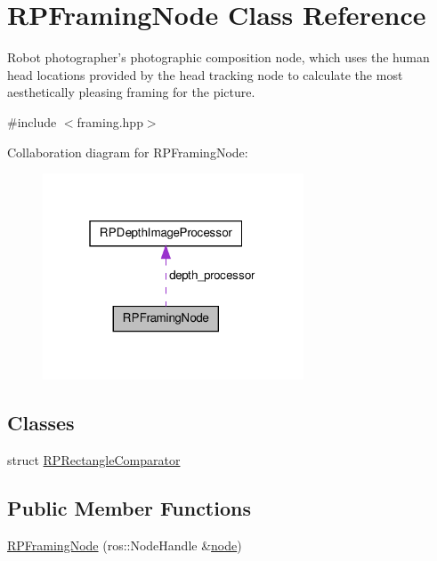 \hypertarget{class_r_p_framing_node}{\section{\-R\-P\-Framing\-Node \-Class \-Reference}
\label{class_r_p_framing_node}
}


\-Robot photographer's photographic composition node, which uses the human head locations provided by the head tracking node to calculate the most aesthetically pleasing framing for the picture.  




{\ttfamily \#include $<$framing.\-hpp$>$}



\-Collaboration diagram for \-R\-P\-Framing\-Node\-:\nopagebreak
\begin{figure}[H]
\begin{center}
\leavevmode
\includegraphics[width=220pt]{class_r_p_framing_node__coll__graph}
\end{center}
\end{figure}
\subsection*{\-Classes}
\begin{DoxyCompactItemize}
\item 
struct \hyperlink{struct_r_p_framing_node_1_1_r_p_rectangle_comparator}{\-R\-P\-Rectangle\-Comparator}
\end{DoxyCompactItemize}
\subsection*{\-Public \-Member \-Functions}
\begin{DoxyCompactItemize}
\item 
\hyperlink{class_r_p_framing_node_a673807f4faa477371ed702853867d696}{\-R\-P\-Framing\-Node} (ros\-::\-Node\-Handle \&\hyperlink{class_r_p_framing_node_ada7424816ecc44a22fc3f96eb32ed51d}{node})
\end{DoxyCompactItemize}
